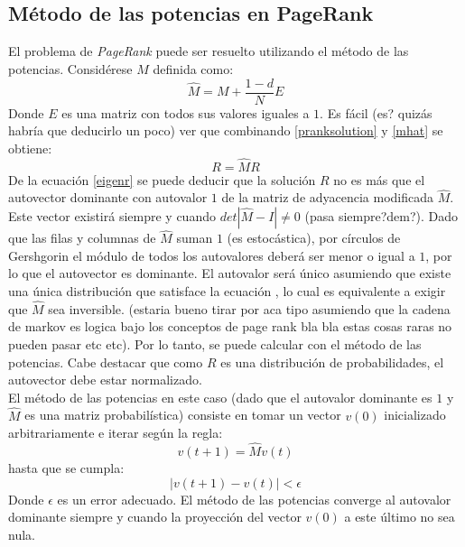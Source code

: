 \documentclass[%
    final,
    reprint,
    notitlepage,
    narroweqnarray,
    inline,
    twoside,
    invited
    ]{ieee}
\begin{document}
\subsection{Método de las potencias en PageRank}
El problema de \textit{PageRank} puede ser resuelto utilizando el método de las potencias. Considérese $\widehat{M}$ definida como:
\begin{equation}\label{mhat}
\widehat{M} = M + \frac{1-d}{N}E
\end{equation}
Donde $E$ es una matriz con todos sus valores iguales a $1$. Es fácil (es? quizás habría que deducirlo un poco) ver que combinando \eqref{pranksolution} 
y \eqref{mhat} se obtiene:
\begin{equation}\label{eigenr}
R = \widehat{M}R
\end{equation}
De la ecuación \eqref{eigenr} se puede deducir que la solución $R$ no es más que el autovector dominante con autovalor $1$ de la matriz de adyacencia 
modificada $\widehat{M}$. Este vector existirá siempre y cuando $det\left|\widehat{M}-I\right| \neq 0 $ (pasa siempre?dem?). Dado que las filas y columnas de 
$\widehat{M}$ suman $1$ (es estocástica), por círculos de Gershgorin el módulo de todos los autovalores deberá ser menor o igual a $1$, por lo que el autovector 
es dominante. El autovalor será único asumiendo que existe una única distribución que satisface la ecuación \label{eigenr}, lo cual es equivalente a exigir 
que $\widehat{M}$ sea inversible. (estaria bueno tirar por aca tipo asumiendo que la cadena de markov es logica bajo los conceptos de page rank bla bla
 estas cosas raras no pueden pasar etc etc).
Por lo tanto, se puede calcular con el método de las potencias. Cabe destacar que como 
$R$ es una distribución de probabilidades, el autovector debe estar normalizado.\\
El método de las potencias en este caso (dado que el autovalor dominante es $1$ y $\widehat{M}$ es una matriz probabilística) 
consiste en tomar un vector $v(0)$ inicializado 
arbitrariamente e iterar según la regla:
\begin{equation}
v(t+1) = \widehat{M}v(t)
\end{equation} 
hasta que se cumpla:
\begin{equation}
\left| v(t+1) - v(t) \right| < \epsilon
\end{equation}
Donde $\epsilon$ es un error adecuado. El método de las potencias converge al autovalor dominante siempre y cuando la proyección del vector $v(0)$ a este 
último no sea nula.
\end{document}
